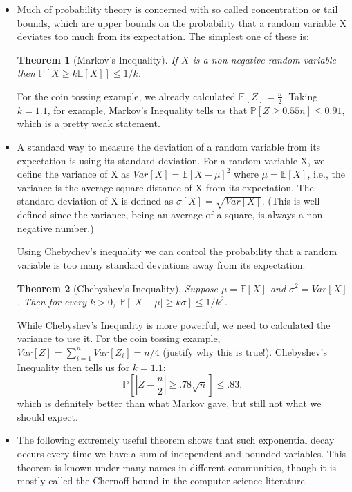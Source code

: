 \documentclass[11pt]{article}
\newtheorem{theorem}{Theorem}
\theoremstyle{definition}
\begin{document}
\begin{itemize}
\item Much of probability theory is concerned with so called concentration or tail bounds, which are upper bounds on the probability that a random variable X deviates too much from its expectation. The simplest one of these is: 

\begin{theorem}[Markov's Inequality]
If $X$ is a non-negative random variable then $\mathbb{P} [X \geq k \mathbb{E} [X]] \leq 1/k$.
\end{theorem}

For the coin tossing example, we already calculated $\mathbb{E}[Z] = \frac{n}{2}$. Taking $k=1.1$, for example, Markov's Inequality tells us that $\mathbb{P} [Z \geq 0.55n] \leq 0.91$, which is a pretty weak statement. 

\item
A standard way to measure the deviation of a random variable from its expectation is using its standard deviation. For a random variable X, we define the variance of X as $Var[X] = \mathbb{E}[X - \mu]^2$ where $\mu = \mathbb{E} [X]$, i.e., the variance is the average square distance of X from its expectation. The standard deviation of X is defined as $\sigma[X] =  \sqrt{Var[X]} $. (This is well defined since the variance, being an average of a square, is always a non-negative number.)

Using Chebychev's inequality we can control the probability that a random variable is too many standard deviations away from its expectation.


\begin{theorem}[Chebyshev's Inequality]
 Suppose $\mu = \mathbb{E} [X] $ and $\sigma ^2 = Var[X]$. Then for every $k>0$, $\mathbb{P} [|X-\mu | \geq k\sigma ] \leq 1/k^2$.
\end{theorem}

While Chebyshev's Inequality is more powerful, we need to calculated the variance to use it. For the coin tossing example, $Var[Z] = \sum_{i=1}^n Var[Z_i] = n/4$ (justify why this is true!). Chebyshev's Inequality then tells us for $k=1.1$:
\[
\mathbb{P} [|Z - \frac{n}{2} | \geq .78 \sqrt{n} ] \leq .83,
\]
which is definitely better than what Markov gave, but still not what we should expect.

\item
The following extremely useful theorem shows that such exponential decay occurs every time we have a sum of independent and bounded variables. This theorem is known under many names in different communities, though it is mostly called the Chernoff bound in the computer science literature.



\end{itemize}
\end{document}
